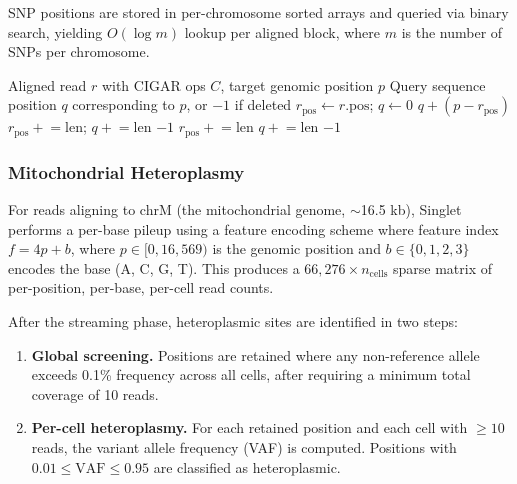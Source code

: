 \documentclass[11pt,a4paper]{article}
\begin{document}
SNP positions are stored in per-chromosome sorted arrays and queried via binary search, yielding $O(\log m)$ lookup per aligned block, where $m$ is the number of SNPs per chromosome.

\begin{algorithm}[t]
\caption{CIGAR base walk for SNP position resolution}\label{alg:cigarwalk}
\begin{algorithmic}[1]
\Require Aligned read $r$ with CIGAR ops $C$, target genomic position $p$
\Ensure Query sequence position $q$ corresponding to $p$, or $-1$ if deleted
\State $r_\text{pos} \gets r.\text{pos}$; $q \gets 0$
     
            \State \Return $q + (p - r_\text{pos})$
        \EndIf
        \State $r_\text{pos} \mathrel{+}= \text{len}$; $q \mathrel{+}= \text{len}$
     
            \State \Return $-1$ 
        \EndIf
        \State $r_\text{pos} \mathrel{+}= \text{len}$
     
        \State $q \mathrel{+}= \text{len}$
    \EndIf
\EndFor
\State \Return $-1$
\end{algorithmic}
\end{algorithm}

\subsubsection{Mitochondrial Heteroplasmy}

For reads aligning to chrM (the mitochondrial genome, $\sim$16.5 kb), Singlet performs a per-base pileup using a feature encoding scheme where feature index $f = 4p + b$, where $p \in [0, 16{,}569)$ is the genomic position and $b \in \{0, 1, 2, 3\}$ encodes the base (A, C, G, T). This produces a $66{,}276 \times n_\text{cells}$ sparse matrix of per-position, per-base, per-cell read counts.

After the streaming phase, heteroplasmic sites are identified in two steps:

\begin{enumerate}
    \item \textbf{Global screening.} Positions are retained where any non-reference allele exceeds 0.1\% frequency across all cells, after requiring a minimum total coverage of 10 reads.
    \item \textbf{Per-cell heteroplasmy.} For each retained position and each cell with $\geq 10$ reads, the variant allele frequency (VAF) is computed. Positions with $0.01 \leq \text{VAF} \leq 0.95$ are classified as heteroplasmic.
\end{enumerate}
\end{document}
